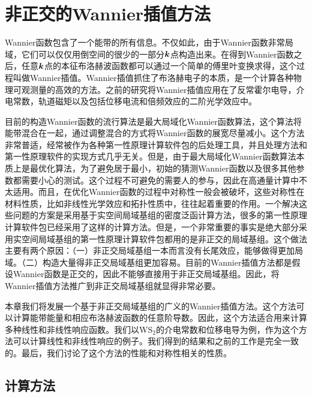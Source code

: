 \chapter{非正交的Wannier插值方法}

Wannier函数包含了一个能带的所有信息。不仅如此，由于Wannier函数非常局域，它们可以仅仅用倒空间的很少的一部分$\boldsymbol{k}$点构造出来\cite{souza_maximally-localized_2001,marzari_maximally_1997}。在得到Wannier函数之后，任意$\boldsymbol{k}$点的本征布洛赫波函数都可以通过一个简单的傅里叶变换求得，这个过程叫做Wannier插值\cite{marzari_maximally_2012}。Wannier插值抓住了布洛赫电子的本质，是一个计算各种物理可观测量的高效的方法。之前的研究将Wannier插值应用在了反常霍尔电导\cite{wang_textitab_2006}，介电常数\cite{yates_spectral_2007}，轨道磁矩\cite{lopez_wannier-based_2012}以及包括位移电流\cite{wang_first-principles_2017,ibanez-azpiroz_ab_2018}和倍频效应\cite{wang_first-principles_2017}的二阶光学效应中。


目前的构造Wannier函数的流行算法是最大局域化Wannier函数算法，这个算法将能带混合在一起，通过调整混合的方式将Wannier函数的展宽尽量减小\cite{marzari_maximally_2012}。这个方法非常普适，经常被作为各种第一性原理计算软件包的后处理工具\cite{mostofi_updated_2014}，并且处理方法和第一性原理软件的实现方式几乎无关。但是，由于最大局域化Wannier函数算法本质上是最优化算法，为了避免居于最小，初始的猜测Wannier函数以及很多其他参数都需要小心的测试。这个过程不可避免的需要人的参与，因此在高通量计算中不太适用。而且，在优化Wannier函数的过程中对称性一般会被破坏，这些对称性在材料性质，比如非线性光学效应和拓扑性质中，往往起着重要的作用。一个解决这些问题的方案是采用基于实空间局域基组的密度泛函计算方法，很多的第一性原理计算软件包已经采用了这样的计算方法。但是，一个非常重要的事实是绝大部分采用实空间局域基组的第一性原理计算软件包都用的是非正交的局域基组。这个做法主要有两个原因：（一）非正交局域基组一本而言没有长尾效应，能够做得更加局域。（二）构造大量得非正交局域基组更加容易。目前的Wannier插值方法都是假设Wannier函数是正交的，因此不能够直接用于非正交局域基组。因此，将Wannier插值方法推广到非正交局域基组就显得非常必要。

本章我们将发展一个基于非正交局域基组的广义的Wannier插值方法。这个方法可以计算能带能量和相应布洛赫波函数的任意阶导数。因此，这个方法适合用来计算多种线性和非线性响应函数。我们以WS$_2$的介电常数和位移电导为例，作为这个方法可以计算线性和非线性响应的例子。我们得到的结果和之前的工作是完全一致的。最后，我们讨论了这个方法的性能和对称性相关的性质。

\section{计算方法}\label{sec:method}

